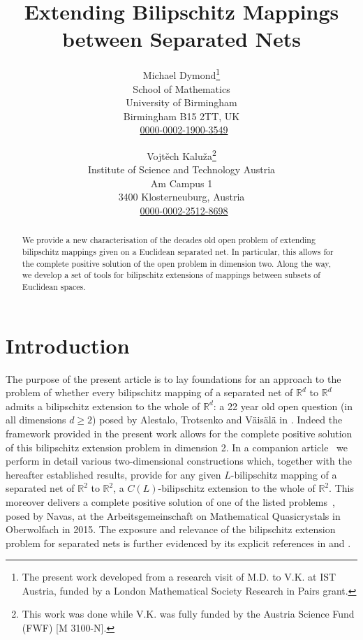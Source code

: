 \documentclass[a4paper, bibliography=totoc]{scrartcl}
\title{Extending Bilipschitz Mappings between Separated Nets}
\author{Michael Dymond\thanks{The present work developed from a research visit of M.D. to V.K. at IST Austria, funded by a London Mathematical Society Research in Pairs grant.} \\ \small{School of Mathematics}
	\\ \small{University of Birmingham}
	\\ \small{Birmingham B15 2TT, UK}
	\\ \small{\orcidicon{0000-0002-1900-3549}\ \href{https://orcid.org/0000-0002-1900-3549}{0000-0002-1900-3549}
	}	\and	Vojtěch Kaluža\thanks{This work was done while V.K. was fully funded by the Austria Science Fund (FWF) [M 3100-N].}
	\\ \small{Institute of Science and Technology Austria}
	\\ \small{Am Campus 1}
	\\ \small{3400 Klosterneuburg, Austria}
	\\ \small{\orcidicon{0000-0002-2512-8698}\ \href{https://orcid.org/0000-0002-2512-8698}{0000-0002-2512-8698}
}}
\date{}
\numberwithin{claimcounter}{define}
\newcommand{\R}{\mathbb{R}}
\newcommand{\Z}{\mathbb{Z}}
\begin{document}
	\maketitle
	\begin{abstract}
		We provide a new characterisation of the decades old open problem of extending bilipschitz mappings given on a Euclidean separated net. In particular, this allows for the complete positive solution of the open problem in dimension two. Along the way, we develop a set of tools for bilipschitz extensions of mappings between subsets of Euclidean spaces.
	\end{abstract}





\section{Introduction}
The purpose of the present article is to lay foundations for an approach to the problem of whether every bilipschitz mapping of a separated net of $\R^{d}$ to $\R^{d}$ admits a bilipschitz extension to the whole of $\R^{d}$: a 22 year old open question (in all dimensions $d\geq 2$) posed by Alestalo, Trotsenko and  Väisälä in \cite{bilip_ext_sep_nets}. Indeed the framework provided in the present work allows for the complete positive solution of this bilipschitz extension problem in dimension 2. In a companion article~\cite{DK_2dim} we perform in detail various two-dimensional constructions which, together with the hereafter established results, provide for any given $L$-bilipschitz mapping of a separated net of $\R^2$ to $\R^2$, a $C(L)$-bilipschitz extension to the whole of $\R^2$. This moreover delivers a complete positive solution of one of the listed problems~\cite[Problem~2.6.1]{adiceam2016open}, posed by Navas, at the Arbeitsgemeinschaft on Mathematical Quasicrystals in Oberwolfach in 2015. The exposure and relevance of the bilipschitz extension problem for separated nets is further evidenced by its explicit references in \cite[Remark~7]{cortez2016some} and \cite[p.6205]{smilansky_solomon_2022}. 
\end{document}
